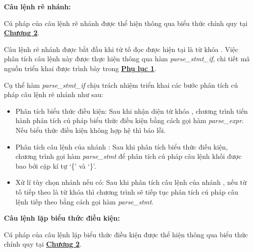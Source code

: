 

\textbf{Câu lệnh rẽ nhánh:} 

Cú pháp của câu lệnh rẽ nhánh được thể hiện thông qua biểu thức chính quy tại \hyperref[ch2:if_stmt]{\bf Chương 2}.

Câu lệnh rẽ nhánh được bắt đầu khi từ tố đọc được hiện tại là từ khóa . Việc phân tích câu lệnh này được thực hiện thông qua hàm \textit{parse\_stmt\_if}, chi tiết mã nguồn triển khai được trình bày trong \hyperref[ap1:stmtwhen]{\bf Phụ lục 1}. %
        
        
Cụ thể hàm \textit{parse\_stmt\_if} chịu trách nhiệm triển khai các bước phân tích cú pháp câu lệnh rẽ nhánh như sau:
\begin{itemize}
    \item Phân tích biểu thức điều kiện: 
    Sau khi nhận diện từ khóa , chương trình tiến hành phân tích cú pháp biểu thức điều kiện bằng cách gọi hàm \textit{parse\_expr}. Nếu biểu thức điều kiện không hợp hệ thì báo lỗi.
    \item Phân tích câu lệnh của nhánh :
    Sau khi phân tích biểu thức điều kiện, chương trình gọi hàm \textit{parse\_stmt} để phân tích cú pháp câu lệnh khối được bao bởi cặp kí tự `\{' và `\}'.
    \item Xử lí tùy chọn nhánh  nếu có:
    Sau khi phân tích câu lệnh của nhánh , nếu từ tố tiếp theo là từ khóa  thì chương trình sẽ tiếp tục phân tích cú pháp câu lệnh tiếp theo bằng cách gọi hàm \textit{parse\_stmt}.

\end{itemize}

\textbf{Câu lệnh lặp biểu thức điều kiện:}

Cú pháp của câu lệnh lặp biểu thức điều kiện được thể hiện thông qua biểu thức chính quy tại \hyperref[ch2:while_stmt]{\bf Chương 2}.

